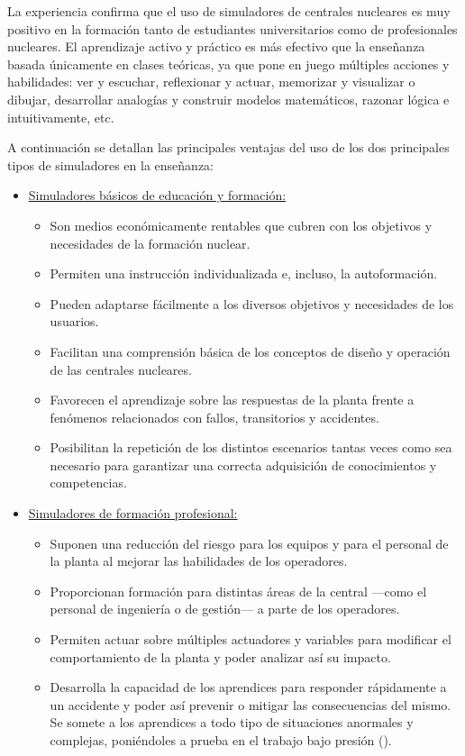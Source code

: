 La experiencia confirma que el uso de simuladores de centrales nucleares es muy positivo en la formación tanto de estudiantes universitarios como de profesionales nucleares. El aprendizaje activo y práctico es más efectivo que la enseñanza basada únicamente en clases teóricas, ya que pone en juego múltiples acciones y habilidades: ver y escuchar, reflexionar y actuar, memorizar y visualizar o dibujar, desarrollar analogías y construir modelos matemáticos, razonar lógica e intuitivamente, etc.

A continuación se detallan las principales ventajas del uso de los dos principales tipos de simuladores en la enseñanza:

\begin{itemize}
  \item \underline{Simuladores básicos de educación y formación:}
  \begin{itemize}
    \item Son medios económicamente rentables que cubren con los objetivos y necesidades de la formación nuclear.
    \item Permiten una instrucción individualizada e, incluso, la autoformación.
    \item Pueden adaptarse fácilmente a los diversos objetivos y necesidades de los usuarios.
    \item Facilitan una comprensión básica de los conceptos de diseño y operación de las centrales nucleares.
    \item Favorecen el aprendizaje sobre las respuestas de la planta frente a fenómenos relacionados con fallos, transitorios y accidentes.
    \item Posibilitan la repetición de los distintos escenarios tantas veces como sea necesario para garantizar una correcta adquisición de conocimientos y competencias.
  \end{itemize}
  \item \underline{Simuladores de formación profesional:}
  \begin{itemize}
    \item Suponen una reducción del riesgo para los equipos y para el personal de la planta al mejorar las habilidades de los operadores.
    \item Proporcionan formación para distintas áreas de la central ---como el personal de ingeniería o de gestión--- a parte de los operadores.
    \item Permiten actuar sobre múltiples actuadores y variables para modificar el comportamiento de la planta y poder analizar así su impacto.
    \item Desarrolla la capacidad de los aprendices para responder rápidamente a un accidente y poder así prevenir o mitigar las consecuencias del mismo. Se somete a los aprendices a todo tipo de situaciones anormales y complejas, poniéndoles a prueba en el trabajo bajo presión (\cite{international2019iaea}).
  \end{itemize} 
\end{itemize}

